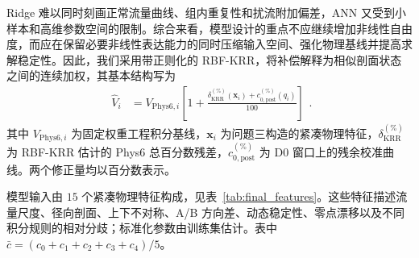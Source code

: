 Ridge 难以同时刻画正常流量曲线、组内重复性和扰流附加偏差，ANN 又受到小样本和高维参数空间的限制。综合来看，模型设计的重点不应继续增加非线性自由度，而应在保留必要非线性表达能力的同时压缩输入空间、强化物理基线并提高求解稳定性。因此，我们采用带正则化的 RBF-KRR，将补偿解释为相似剖面状态之间的连续加权，其基本结构写为
\begin{equation}
\boxed{
\begin{aligned}
\hat V_i
&=V_{\mathrm{Phys6},i}
\left[
1+\frac{
\delta_{\mathrm{KRR}}^{(\%)}(\boldsymbol{x}_i)+
c_{0,\mathrm{post}}^{(\%)}(q_i)}{100}
\right]
\end{aligned}
}.
\label{eq:final_krr_model}
\end{equation}
其中 $V_{\mathrm{Phys6},i}$ 为固定权重工程积分基线，$\boldsymbol{x}_i$ 为问题三构造的紧凑物理特征，$\delta_{\mathrm{KRR}}^{(\%)}$ 为 RBF-KRR 估计的 Phys6 总百分数残差，$c_{0,\mathrm{post}}^{(\%)}$ 为 D0 窗口上的残余校准曲线。两个修正量均以百分数表示。

模型输入由 $15$ 个紧凑物理特征构成，见表~\ref{tab:final_features}。这些特征描述流量尺度、径向剖面、上下不对称、A/B 方向差、动态稳定性、零点漂移以及不同积分规则的相对分歧；标准化参数由训练集估计。表中 $\bar c=(c_0+c_1+c_2+c_3+c_4)/5$。

